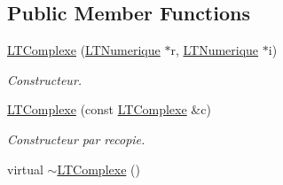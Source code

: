 \subsection*{Public Member Functions}
\begin{DoxyCompactItemize}
\item 
\hyperlink{class_l_t_complexe_a91582aad82590e2ab764f3aeb9e72c2a}{L\+T\+Complexe} (\hyperlink{class_l_t_numerique}{L\+T\+Numerique} $\ast$r, \hyperlink{class_l_t_numerique}{L\+T\+Numerique} $\ast$i)
\begin{DoxyCompactList}\small\item\em Constructeur. \end{DoxyCompactList}\item 
\hyperlink{class_l_t_complexe_a2faa66c9789d43cc860bc6cda3cb0f2b}{L\+T\+Complexe} (const \hyperlink{class_l_t_complexe}{L\+T\+Complexe} \&c)
\begin{DoxyCompactList}\small\item\em Constructeur par recopie. \end{DoxyCompactList}\item 
virtual \hyperlink{class_l_t_complexe_a124f7db9ebee524023e48035c42ae1c4}{$\sim$\+L\+T\+Complexe} ()\hypertarget{class_l_t_complexe_a124f7db9ebee524023e48035c42ae1c4}{}\label{class_l_t_complexe_a124f7db9ebee524023e48035c42ae1c4}


\end{DoxyCompactItemize}
